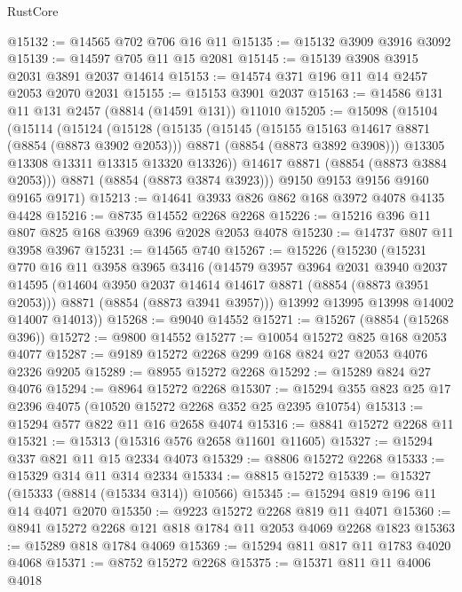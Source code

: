 \begin{lexlean}{RustCore}
\begin{coremodule}
@15132 := @14565 @702 @706 @16 @11
@15135 := @15132 @3909 @3916 @3092
@15139 := @14597 @705 @11 @15 @2081
@15145 := @15139 @3908 @3915 @2031 @3891 @2037 @14614
@15153 := @14574 @371 @196 @11 @14 @2457 @2053 @2070 @2031
@15155 := @15153 @3901 @2037
@15163 := @14586 @131 @11 @131 @2457 (@8814 (@14591 @131)) @11010
@15205 := @15098
    (@15104
      (@15114
        (@15124
          (@15128
            (@15135
              (@15145
                (@15155 @15163 @14617 @8871 (@8854 (@8873 @3902 @2053)))
                @8871
                (@8854 (@8873 @3892 @3908)))
              @13305
              @13308
              @13311
              @13315
              @13320
              @13326))
          @14617
          @8871
          (@8854 (@8873 @3884 @2053)))
        @8871
        (@8854 (@8873 @3874 @3923)))
      @9150
      @9153
      @9156
      @9160
      @9165
      @9171)
@15213 := @14641 @3933 @826 @862 @168 @3972 @4078 @4135 @4428
@15216 := @8735 @14552 @2268 @2268
@15226 := @15216 @396 @11 @807 @825 @168 @3969 @396 @2028 @2053 @4078
@15230 := @14737 @807 @11 @3958 @3967
@15231 := @14565 @740
@15267 := @15226
    (@15230
      (@15231
        @770
        @16
        @11
        @3958
        @3965
        @3416
        (@14579
          @3957
          @3964
          @2031
          @3940
          @2037
          @14595
          (@14604 @3950 @2037 @14614 @14617 @8871 (@8854 (@8873 @3951 @2053)))
          @8871
          (@8854 (@8873 @3941 @3957)))
        @13992
        @13995
        @13998
        @14002
        @14007
        @14013))
@15268 := @9040 @14552
@15271 := @15267 (@8854 (@15268 @396))
@15272 := @9800 @14552
@15277 := @10054 @15272 @825 @168 @2053 @4077
@15287 := @9189 @15272 @2268 @299 @168 @824 @27 @2053 @4076 @2326 @9205
@15289 := @8955 @15272 @2268
@15292 := @15289 @824 @27 @4076
@15294 := @8964 @15272 @2268
@15307 := @15294 @355 @823 @25 @17 @2396 @4075 (@10520 @15272 @2268 @352 @25 @2395 @10754)
@15313 := @15294 @577 @822 @11 @16 @2658 @4074
@15316 := @8841 @15272 @2268 @11
@15321 := @15313 (@15316 @576 @2658 @11601 @11605)
@15327 := @15294 @337 @821 @11 @15 @2334 @4073
@15329 := @8806 @15272 @2268
@15333 := @15329 @314 @11 @314 @2334
@15334 := @8815 @15272
@15339 := @15327 (@15333 (@8814 (@15334 @314)) @10566)
@15345 := @15294 @819 @196 @11 @14 @4071 @2070
@15350 := @9223 @15272 @2268 @819 @11 @4071
@15360 := @8941 @15272 @2268 @121 @818 @1784 @11 @2053 @4069 @2268 @1823
@15363 := @15289 @818 @1784 @4069
@15369 := @15294 @811 @817 @11 @1783 @4020 @4068
@15371 := @8752 @15272 @2268
@15375 := @15371 @811 @11 @4006 @4018

\end{coremodule}
\end{lexlean}
